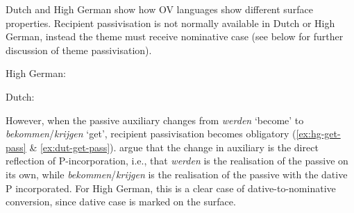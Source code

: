 Dutch and High German show how OV languages show different surface properties. Recipient passivisation is not normally available in Dutch or High German, instead the theme must receive nominative case (see below for further discussion of theme passivisation).

\begin{exe}
	\ex High German:\label{ex:hg-normal-pass}
\begin{xlist}
\end{xlist}
\ex Dutch:\label{ex:dutch-normal-pass}
\begin{xlist}
\end{xlist}
\end{exe}


However, when the passive auxiliary changes from \textit{werden} `become' to \textit{bekommen}/\textit{krijgen} `get', recipient passivisation becomes obligatory (\ref{ex:hg-get-pass} \& \ref{ex:dut-get-pass}). \cite{Alexiadou.2014} argue that the change in auxiliary is the direct reflection of P-incorporation, i.e., that \textit{werden} is the realisation of the passive on its own, while \textit{bekommen}/\textit{krijgen} is the realisation of the passive with the dative P incorporated. For High German, this is a clear case of dative-to-nominative conversion, since dative case is marked on the surface.

